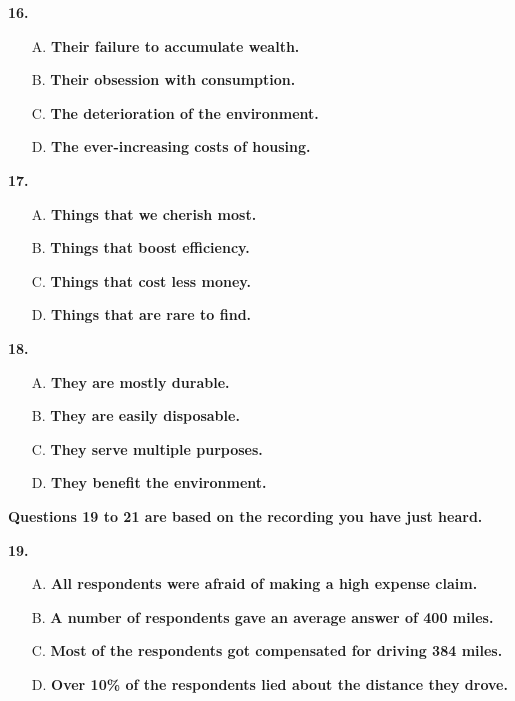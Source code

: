 \documentclass[UTF8,11pt]{ctexart}
\begin{document}
\textbf{16.}


\begin{itemize}[leftmargin=2em,itemsep=.2em,topsep=.4em]\item[A.] \textbf{Their failure to accumulate wealth.}
\item[B.] \textbf{Their obsession with consumption.}
\item[C.] \textbf{The deterioration of the environment.}
\item[D.] \textbf{The ever-increasing costs of housing.}
\end{itemize}

\textbf{17.}


\begin{itemize}[leftmargin=2em,itemsep=.2em,topsep=.4em]\item[A.] \textbf{Things that we cherish most.}
\item[B.] \textbf{Things that boost efficiency.}
\item[C.] \textbf{Things that cost less money.}
\item[D.] \textbf{Things that are rare to find.}
\end{itemize}

\textbf{18.}


\begin{itemize}[leftmargin=2em,itemsep=.2em,topsep=.4em]\item[A.] \textbf{They are mostly durable.}
\item[B.] \textbf{They are easily disposable.}
\item[C.] \textbf{They serve multiple purposes.}
\item[D.] \textbf{They benefit the environment.}
\end{itemize}

\textbf{Questions 19 to 21 are based on the recording you have just heard.}


\textbf{19.}


\begin{itemize}[leftmargin=2em,itemsep=.2em,topsep=.4em]\item[A.] \textbf{All respondents were afraid of making a high expense claim.}
\item[B.] \textbf{A number of respondents gave an average answer of 400 miles.}
\item[C.] \textbf{Most of the respondents got compensated for driving 384 miles.}
\item[D.] \textbf{Over 10\% of the respondents lied about the distance they drove.}
\end{itemize}
\end{document}
